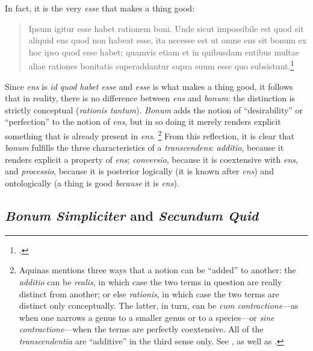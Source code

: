 In fact, it is the very \emph{esse} that makes a thing good:
%
\begin{quotation}
Ipsum igitur esse habet rationem boni. Unde sicut impossibile est quod sit aliquid ens quod non habeat esse, ita necesse est ut omne ens sit bonum ex hoc ipso quod esse habet; quamvis etiam et in quibusdam entibus multae aliae rationes bonitatis superaddantur supra suum esse quo subsistunt.\footcite[q.~21, a.~2]{st:deveritate}
\end{quotation}
%
Since \emph{ens} is \emph{id quod habet esse} and \emph{esse} is what makes a thing good, it follows that in reality, there is no difference between \emph{ens} and \emph{bonum}: the distinction is strictly conceptual (\emph{rationis tantum}). \emph{Bonum} adds the notion of “desirability” or “perfection” to the notion of \emph{ens}, but in so doing it merely renders explicit something that is already present in \emph{ens}.%
%
\footnote{Aquinas mentions three ways that a notion can be “added” to another: the \emph{additio} can be \emph{realis}, in which case the two terms in question are really distinct from another; or else \emph{rationis}, in which case the two terms are distinct only conceptually. The latter, in turn, can be \emph{cum contractione}—as when one narrows a genus to a smaller genus or to a species—or \emph{sine contractione}—when the terms are perfectly coextensive. All of the \emph{transcendentia} are “additive” in the third sense only. See \cite[q.~21, a.~1, co., and q.~1, a.~1, co.]{st:deveritate}, as well as \cite[See also][192]{wippel:metaphysical_thought}.} From this reflection, it is clear that \emph{bonum} fulfills the three characteristics of a \emph{transcendens}: \emph{additio}, because it renders explicit a property of \emph{ens}; \emph{conversio}, because it is coextensive with \emph{ens}, and \emph{processio}, because it is posterior logically (it is known after \emph{ens}) and ontologically (a thing is good \emph{because} it is \emph{ens}).

\subsection{\emph{Bonum Simpliciter} and  \emph{Secundum Quid}}

